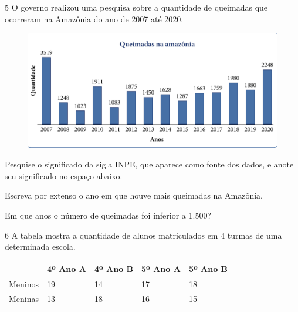 
\num{5} O governo realizou uma pesquisa sobre a quantidade de queimadas
que ocorreram na Amazônia do ano de 2007 até 2020.

\begin{figure}[htpb!]
\centering
\includegraphics[width=.9\textwidth]{../ilustracoes/MAT5/SAEB_5ANO_MAT_figura105.png}
\end{figure}

\pagebreak

\begin{escolha}
\item
  Pesquise o significado da sigla INPE, que aparece como fonte dos dados,
  e anote seu significado no espaço abaixo.


\item
  Escreva por extenso o ano em que houve mais queimadas na Amazônia.


\item
  Em que anos o número de queimadas foi inferior a 1.500?

\end{escolha}

\num{6} A tabela mostra a quantidade de alunos matriculados em 4 turmas de
uma determinada escola.

\begin{longtable}[]{@{}lllll@{}}
\toprule
& 4º Ano A & 4º Ano B & 5º Ano A & 5º Ano B\tabularnewline
\midrule
\endhead
Meninos & 19 & 14 & 17 & 18\tabularnewline
Meninas & 13 & 18 & 16 & 15\tabularnewline
\bottomrule
\end{longtable}


